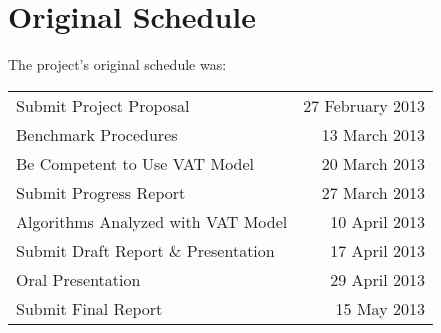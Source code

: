\section{Original Schedule}
  The project's original schedule was:
  \begin{tabular}{lr}
    Submit Project Proposal             & 27 February 2013\\
    Benchmark Procedures                & 13 March 2013   \\
    Be Competent to Use VAT Model       & 20 March 2013   \\
    Submit Progress Report              & 27 March 2013   \\
    Algorithms Analyzed with VAT Model  & 10 April 2013 \\
    Submit Draft Report \& Presentation & 17 April 2013   \\
    Oral Presentation                   & 29 April 2013   \\
    Submit Final Report                 & 15 May 2013     \\
  \end{tabular}
  
